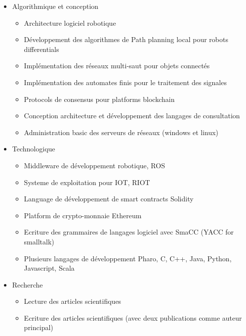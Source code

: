 \documentclass{resume} %
\begin{document}
	\begin{itemize} 				
			\item Algorithmique et conception 
					\begin{itemize}
						\item Architecture logiciel robotique 
						\item Développement des algorithmes de Path planning local pour robots differentials 
						\item Implémentation des réseaux  multi-saut pour objets connectés 
						\item Implémentation des automates finis pour le traitement des signales
						\item Protocols de consensus pour platforms blockchain 
						\item Conception architecture et développement des langages de consultation 
						\item Administration basic des serveurs de réseaux (windows et linux)
					\end {itemize}
			\item Technologique
					\begin{itemize}
						\item Middleware de développement robotique, ROS 
						\item Systeme de exploitation pour IOT, RIOT 
						\item Language de développement de smart contracts Solidity 
						\item Platform de crypto-monnaie Ethereum
						\item Ecriture des grammaires de langages logiciel avec SmaCC (YACC for smalltalk) 
						\item Plusieurs langages de développement Pharo, C, C++, Java, Python, Javascript, Scala
					\end {itemize}
			\item  Recherche 
				\begin{itemize}
						\item Lecture des articles scientifiques 
						\item Ecriture des articles scientifiques (avec deux publications comme auteur principal) 
				\end {itemize}
		\end{itemize}
		


		
\end{document}
